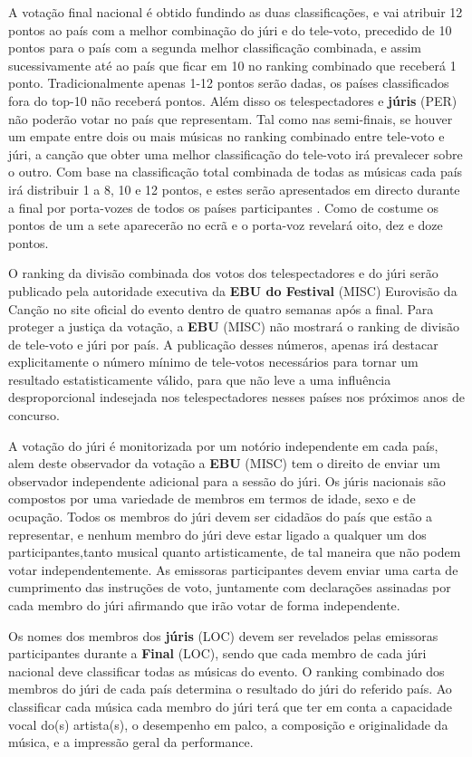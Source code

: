 \documentclass[12pt,a4paper]{article}
\begin{document}
A votação final nacional é obtido fundindo as duas classificações, e vai atribuir 12 pontos ao país com a melhor combinação do júri e do tele-voto, precedido de 10 pontos para o país com a segunda melhor classificação combinada, e assim sucessivamente até ao país que ficar em 10  no ranking combinado que receberá 1 ponto. Tradicionalmente apenas 1-12 pontos serão dadas, os países classificados fora do top-10 não receberá pontos. Além disso os telespectadores e \textbf{júris} (PER) não poderão votar no país que representam. Tal como nas semi-finais, se houver um empate entre dois ou mais músicas no ranking combinado entre tele-voto e júri, a canção que obter uma melhor classificação do tele-voto irá prevalecer sobre o outro. Com base na classificação total combinada de todas as músicas cada país irá distribuir 1 a 8, 10 e 12 pontos, e estes serão apresentados em directo durante a final por porta-vozes de todos os países participantes . Como de costume os pontos de um a sete aparecerão no ecrã e o porta-voz revelará oito, dez e doze pontos.

O ranking da divisão combinada dos votos dos telespectadores e do júri serão publicado pela autoridade executiva da \textbf{EBU do Festival} (MISC) Eurovisão da Canção no site oficial do evento dentro de quatro semanas após a final. Para proteger a justiça da votação, a \textbf{EBU} (MISC) não mostrará o ranking de divisão de tele-voto e júri por país. A publicação desses números, apenas irá destacar explicitamente o número mínimo de tele-votos necessários para tornar um resultado estatisticamente válido, para que não leve a uma influência desproporcional indesejada nos telespectadores nesses países nos próximos anos de concurso.

A votação do júri é monitorizada por um notório independente em cada país, alem deste observador da votação a \textbf{EBU} (MISC) tem o direito de enviar um observador independente adicional para a sessão do júri. Os júris nacionais são compostos por uma variedade de membros em termos de idade, sexo e de ocupação. Todos os membros do júri devem ser cidadãos do país que estão a representar, e nenhum membro do júri deve estar ligado a qualquer um dos participantes,tanto musical quanto artisticamente, de tal maneira que não podem votar independentemente. As emissoras participantes devem enviar uma carta de cumprimento das instruções de voto, juntamente com declarações assinadas por cada membro do júri afirmando que irão votar de forma independente.

Os nomes dos membros dos \textbf{júris} (LOC) devem ser revelados pelas emissoras participantes durante a \textbf{Final} (LOC), sendo que cada membro de cada júri nacional deve classificar todas as músicas do evento. O ranking combinado dos membros do júri de cada país determina o resultado do júri do referido país. Ao classificar cada música cada membro do júri terá que ter em conta a capacidade vocal do(s) artista(s), o desempenho em palco, a composição e originalidade da música, e a impressão geral da performance.
\end{document}
